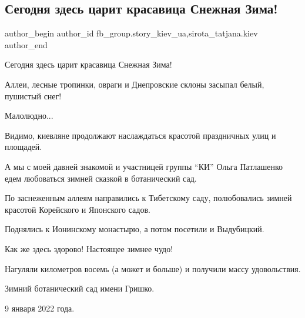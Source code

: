  
 
 
 
 
 
\subsection{Сегодня здесь царит красавица Снежная Зима!}
\label{sec:09_01_2022.fb.fb_group.story_kiev_ua.2.krasavica_zima}
 
\ifcmt
 author_begin
   author_id fb_group.story_kiev_ua,sirota_tatjana.kiev
 author_end
\fi

Сегодня здесь царит красавица Снежная Зима!

Аллеи, лесные тропинки, овраги и Днепровские склоны засыпал белый, пушистый снег! 

Малолюдно...

\raggedcolumns
\begin{multicols}{3} %
\setlength{\parindent}{0pt}




\end{multicols} %

Видимо, киевляне продолжают наслаждаться красотой праздничных улиц и площадей.

А мы с моей давней знакомой и участницей группы \enquote{КИ} Ольга Патлашенко
едем любоваться зимней сказкой в ботанический сад.

По заснеженным аллеям  направились к Тибетскому саду, полюбовались зимней
красотой Корейского и Японского садов.

Поднялись к Ионинскому монастырю, а потом посетили и Выдубицкий.

Как же здесь здорово! Настоящее зимнее чудо!

Нагуляли километров восемь (а может и больше)  и получили массу удовольствия.

Зимний ботанический сад имени Гришко.

9 января 2022 года.
